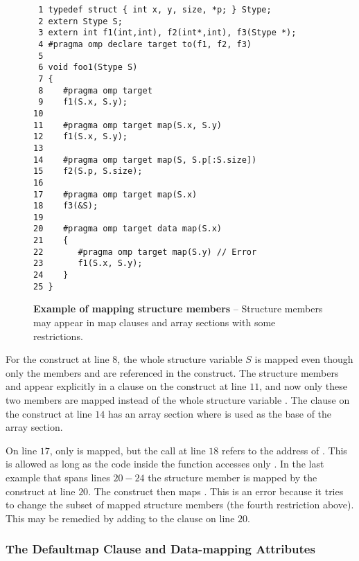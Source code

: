\begin{figure*}[!tb]
\begin{verbatim}
 1 typedef struct { int x, y, size, *p; } Stype;
 2 extern Stype S;
 3 extern int f1(int,int), f2(int*,int), f3(Stype *);
 4 #pragma omp declare target to(f1, f2, f3) 
 5 
 6 void foo1(Stype S)
 7 {
 8    #pragma omp target
 9    f1(S.x, S.y);
10 
11    #pragma omp target map(S.x, S.y)
12    f1(S.x, S.y);
13 
14    #pragma omp target map(S, S.p[:S.size])
15    f2(S.p, S.size);
16 
17    #pragma omp target map(S.x)
18    f3(&S);
19 
20    #pragma omp target data map(S.x)
21    {
22       #pragma omp target map(S.y) // Error
23       f1(S.x, S.y);
24    }
25 }
\end{verbatim}
\caption{ \textbf {Example of mapping structure members} -- \small
          Structure members may appear in map clauses and array sections with some
          restrictions.
         }
\label{figure:chapter6-mapstruct}
\end{figure*}

For the  construct at line $8$, the whole structure variable $S$
is mapped even though only the members  and  are referenced in the
construct.  The structure members  and  appear explicitly in
a  clause on the  construct at line $11$, and now only
these two members are mapped instead of the whole structure variable .  The
 clause on the  construct at line $14$ has an array
section where  is used as the base of the array section.

On line $17$, only  is mapped, but the call at line $18$ refers to the
address of .  This is allowed as long as the code inside the function 
accesses only .  In the last example that spans lines $20-24$ the structure
member  is mapped by the ~ construct at line
$20$.  The  construct then maps .  This is an error because
it tries to change the subset of mapped structure members (the fourth
restriction above).  This may be remedied by adding  to the 
clause on line $20$.

\subsubsection{The Defaultmap Clause and Data-mapping Attributes}
\label{ssec:06.defaultmap-clause}

